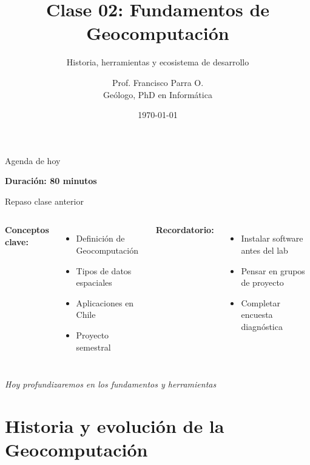 \documentclass[10pt]{beamer}
\title{Clase 02: Fundamentos de Geocomputación}
\subtitle{Historia, herramientas y ecosistema de desarrollo}
\author{Prof. Francisco Parra O. \\ \small{Geólogo, PhD en Informática}}
\institute{USACH - Ingeniería Civil en Informática}
\date{\today}
\begin{document}
\maketitle

\begin{frame}{Agenda de hoy}
    \tableofcontents
    
    \vspace{0.5cm}
    \begin{center}
        \textcolor{usachblue}{} \textbf{Duración: 80 minutos}
    \end{center}
\end{frame}

\begin{frame}{Repaso clase anterior}
    \begin{columns}
        \textbf{Conceptos clave:}
        \begin{itemize}
            \item Definición de Geocomputación
            \item Tipos de datos espaciales
            \item Aplicaciones en Chile
            \item Proyecto semestral
        \end{itemize}
        
        \textbf{Recordatorio:}
        \begin{itemize}
            \item \textcolor{usachred}{} Instalar software antes del lab
            \item \textcolor{usachblue}{} Pensar en grupos de proyecto
            \item \textcolor{green}{} Completar encuesta diagnóstica
        \end{itemize}
    \end{columns}
    
    \vspace{0.5cm}
    \begin{center}
        \textit{Hoy profundizaremos en los fundamentos y herramientas}
    \end{center}
\end{frame}

\section{Historia y evolución de la Geocomputación}
\end{document}
